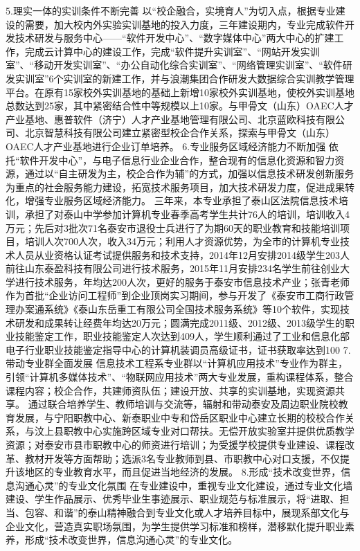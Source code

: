 5.理实一体的实训条件不断完善
以“校企融合，实境育人”为切入点，根据专业建设的需要，加大校内外实验实训基地的投入力度，三年建设期内，专业完成软件开发技术研发与服务中心——“软件开发中心”、“数字媒体中心”两大中心的扩建工作，完成云计算中心的建设工作，完成“软件提升实训室”、“网站开发实训室”、“移动开发实训室”、“办公自动化综合实训室”、“网络管理实训室”、“软件研发实训室”6个实训室的新建工作，并与浪潮集团合作研发大数据综合实训教学管理平台。在原有15家校外实训基地的基础上新增10家校外实训基地，使校外实训基地总数达到25家，其中紧密结合性中等规模以上10家。与甲骨文（山东）OAEC人才产业基地、惠普软件（济宁）人才产业基地管理有限公司、北京蓝欧科技有限公司、北京智慧科技有限公司建立紧密型校企合作关系，探索与甲骨文（山东）OAEC人才产业基地进行企业订单培养。
6.专业服务区域经济能力不断加强
依托“软件开发中心”，与电子信息行业企业合作，整合现有的信息化资源和智力资源，通过以“自主研发为主，校企合作为辅”的方式，加强以信息技术研发创新服务为重点的社会服务能力建设，拓宽技术服务项目，加大技术研发力度，促进成果转化，增强专业服务区域经济能力。
三年来，本专业承担了泰山区法院信息技术培训，承担了对泰山中学参加计算机专业春季高考学生共计76人的培训，培训收入4万元；先后对3批次71名泰安市退役士兵进行了为期60天的职业教育和技能培训项目，培训人次700人次，收入34万元；利用人才资源优势，为全市的计算机专业技术人员从业资格认证考试提供服务和技术支持，2014年12月安排2014级学生203人前往山东泰盈科技有限公司进行技术服务，2015年11月安排234名学生前往创业大学进行技术服务，年均达200人次，更好的服务于泰安市信息技术产业；张青老师作为首批“企业访问工程师”到企业顶岗实习期间，参与开发了《泰安市工商行政管理办案通系统》《泰山东岳重工有限公司全国技术服务系统》等10个软件，实现技术研发和成果转让经费年均达20万元；圆满完成2011级、2012级、2013级学生的职业技能鉴定工作，职业技能鉴定人次达到409人，学生顺利通过了工业和信息化部电子行业职业技能鉴定指导中心的计算机装调员高级证书，证书获取率达到100%
7.带动专业群全面发展
信息技术工程系专业群以“计算机应用技术”专业作为群主，引领“计算机多媒体技术”、“物联网应用技术”两大专业发展，重构课程体系，整合课程内容；校企合作，共建师资队伍；建设开放、共享的实训基地，实现资源共享。
通过联合培养学生、教师培训与交流等，辐射和带动泰安及周边职业院校教育发展，与宁阳职教中心、新泰职业中专和岱岳区职业中心建立长期的校校合作关系，与汶上县职教中心实施跨区域专业对口帮扶。无偿开放实验室并提供优质教学资源；对泰安市县市职教中心的师资进行培训；为受援学校提供专业建设、课程改革、教材开发等方面帮助；选派3名专业教师到县、市职教中心对口支援，不仅提升该地区的专业教育水平，而且促进当地经济的发展。
8.形成“技术改变世界，信息沟通心灵”的专业文化氛围
在专业建设中，重视专业文化建设，通过专业文化墙建设、学生作品展示、优秀毕业生事迹展示、职业规范与标准展示，将“进取、担当、包容、和谐”的泰山精神融合到专业文化或人才培养目标中，展现系部文化与企业文化，营造真实职场氛围，为学生提供学习标准和榜样，潜移默化提升职业素养，形成“技术改变世界，信息沟通心灵”的专业文化。
